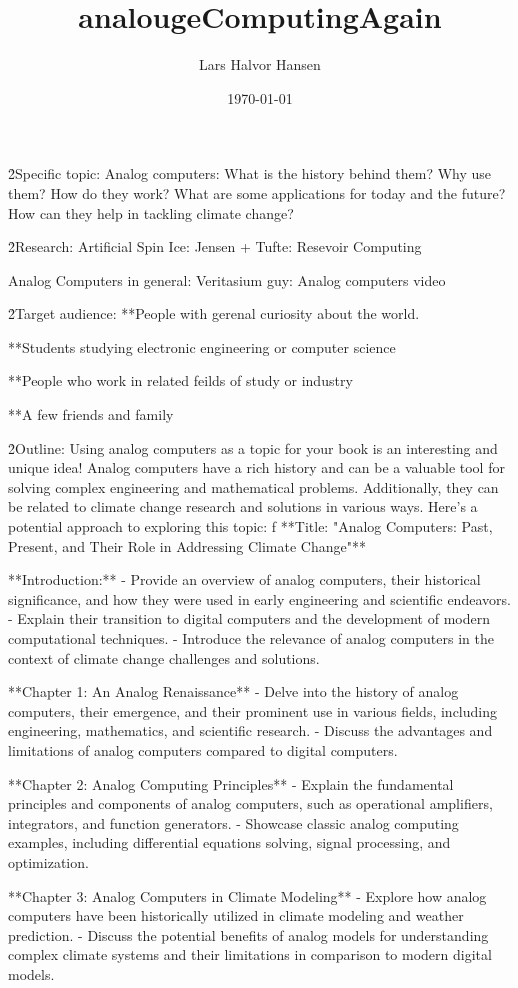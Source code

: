 \documentclass{article}
\title{analougeComputingAgain}
\author{Lars Halvor Hansen}
\date{\today}
\begin{document}
\h2{Specific topic:}
Analog computers:
What is the history behind them?
Why use them?
How do they work?
What are some applications for today and the future?
How can they help in tackling climate change?

\h2{Research:}
Artificial Spin Ice: 
Jensen + Tufte: Resevoir Computing

Analog Computers in general:
Veritasium guy: Analog computers video


\h2{Target audience:}
**People with gerenal curiosity about the world. 

**Students studying electronic engineering or computer science

**People who work in related feilds of study or industry

**A few friends and family

\h2{Outline:}
Using analog computers as a topic for your book is an interesting and unique idea! Analog computers have a rich history and can be a valuable tool for solving complex engineering and mathematical problems. Additionally, they can be related to climate change research and solutions in various ways. Here's a potential approach to exploring this topic:
f
**Title: "Analog Computers: Past, Present, and Their Role in Addressing Climate Change"**

**Introduction:**
- Provide an overview of analog computers, their historical significance, and how they were used in early engineering and scientific endeavors.
- Explain their transition to digital computers and the development of modern computational techniques.
- Introduce the relevance of analog computers in the context of climate change challenges and solutions.

**Chapter 1: An Analog Renaissance**
- Delve into the history of analog computers, their emergence, and their prominent use in various fields, including engineering, mathematics, and scientific research.
- Discuss the advantages and limitations of analog computers compared to digital computers.

**Chapter 2: Analog Computing Principles**
- Explain the fundamental principles and components of analog computers, such as operational amplifiers, integrators, and function generators.
- Showcase classic analog computing examples, including differential equations solving, signal processing, and optimization.

**Chapter 3: Analog Computers in Climate Modeling**
- Explore how analog computers have been historically utilized in climate modeling and weather prediction.
- Discuss the potential benefits of analog models for understanding complex climate systems and their limitations in comparison to modern digital models.
\end{document}
